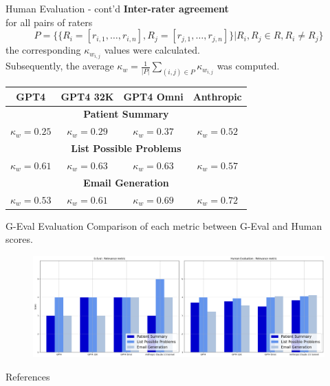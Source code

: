 \documentclass[usenames,dvipsnames]{beamer}
\begin{document}
\begin{frame}{Human Evaluation - cont'd}
  \textbf{Inter-rater agreement}\\
  for all pairs of raters 
  \[
  P=\{\{R_i= [r_{i,1}, \ldots, r_{i,n}],R_j = [r_{j,1},\ldots,r_{j,n}]\}|R_i,R_j\in R, R_i\neq R_j\}
  \]
  the corresponding $\kappa_{w_{i,j}}$ values were calculated.\\
  Subsequently, the average $\kappa_w = \frac{1}{|P|}\sum_{(i,j)\in P} \kappa_{w_{i,j}}$ was computed.
  \vspace{5mm}
  {\tiny
  \begin{table}[b]
    \centering
    \setlength{\extrarowheight}{2pt}
    \begin{tabular}{|c|c|c|c|}
    \hline
    GPT4 & GPT4 32K & GPT4 Omni & Anthropic\\
    \hline
    \multicolumn{4}{|c|}{\textbf{Patient Summary}} \\
    \hline
    $\kappa_w=0.25$ & $\kappa_w=0.29$ & $\kappa_w=0.37$ & $\kappa_w=0.52$ \\
    \hline
    \multicolumn{4}{|c|}{\textbf{List Possible Problems}} \\
    \hline
    $\kappa_w=0.61$ & $\kappa_w=0.63$ & $\kappa_w=0.63$ & $\kappa_w=0.57$ \\
    \hline
    \multicolumn{4}{|c|}{\textbf{Email Generation}} \\
    \hline
    $\kappa_w=0.53$ & $\kappa_w=0.61$ & $\kappa_w=0.69$ & $\kappa_w=0.72$ \\
    \hline
    \end{tabular}
  \end{table}
  }
\end{frame}

\begin{frame}{G-Eval Evaluation}
  Comparison of each metric between G-Eval and Human scores.
  \vspace{5mm}
  \begin{figure}[b]
    \includegraphics[scale=0.1]{images/comparison.png}
  \end{figure}  
\end{frame}

\begin{frame}{}
  


\end{frame}

\begin{frame}{References}


\end{frame}
\end{document}
